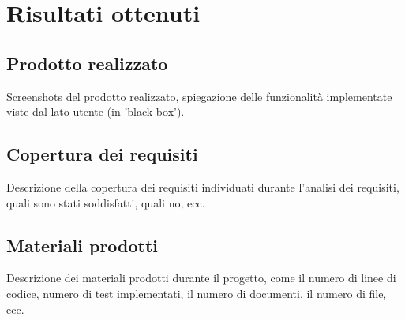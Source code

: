 \section{Risultati ottenuti}
\label{sez:risultati-ottenuti}


\subsection{Prodotto realizzato}
\label{subsec:prodotto-realizzato}

Screenshots del prodotto realizzato, spiegazione delle funzionalità implementate viste dal lato utente (in 'black-box').

\subsection{Copertura dei requisiti}
\label{subsec:copertura-requisiti}

Descrizione della copertura dei requisiti individuati durante l'analisi dei requisiti, quali sono stati soddisfatti, quali no, ecc.

\subsection{Materiali prodotti}
\label{subsec:materiali-prodotti}

Descrizione dei materiali prodotti durante il progetto, come il numero di linee di codice, numero di test implementati, il numero di documenti, il numero di file, ecc.\\

